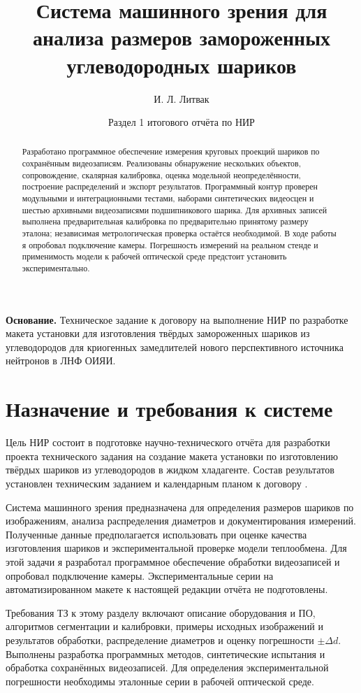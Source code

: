 \documentclass[12pt,a4paper]{article}
\title{Система машинного зрения для анализа размеров замороженных углеводородных шариков}
\author{И. Л. Литвак}
\date{Раздел 1 итогового отчёта по НИР}
\begin{document}
\maketitle
\noindent\textbf{Основание.} Техническое задание к договору на выполнение НИР по разработке макета установки для изготовления твёрдых замороженных шариков из углеводородов для криогенных замедлителей нового перспективного источника нейтронов в ЛНФ ОИЯИ.

\begin{abstract}
Разработано программное обеспечение измерения круговых проекций шариков по сохранённым видеозаписям. Реализованы обнаружение нескольких объектов, сопровождение, скалярная калибровка, оценка модельной неопределённости, построение распределений и экспорт результатов. Программный контур проверен модульными и интеграционными тестами, наборами синтетических видеосцен и шестью архивными видеозаписями подшипникового шарика. Для архивных записей выполнена предварительная калибровка по предварительно принятому размеру эталона; независимая метрологическая проверка остаётся необходимой. В ходе работы я опробовал подключение камеры. Погрешность измерений на реальном стенде и применимость модели к рабочей оптической среде предстоит установить экспериментально.
\end{abstract}
\clearpage
\tableofcontents
\clearpage

\section{Назначение и требования к системе}
Цель НИР состоит в подготовке научно-технического отчёта для разработки проекта технического задания на создание макета установки по изготовлению твёрдых шариков из углеводородов в жидком хладагенте. Состав результатов установлен техническим заданием и календарным планом к договору \cite{tz}.

Система машинного зрения предназначена для определения размеров шариков по изображениям, анализа распределения диаметров и документирования измерений. Полученные данные предполагается использовать при оценке качества изготовления шариков и экспериментальной проверке модели теплообмена. Для этой задачи я разработал программное обеспечение обработки видеозаписей и опробовал подключение камеры. Экспериментальные серии на автоматизированном макете к настоящей редакции отчёта не подготовлены.

Требования ТЗ к этому разделу включают описание оборудования и ПО, алгоритмов сегментации и калибровки, примеры исходных изображений и результатов обработки, распределение диаметров и оценку погрешности $\pm\Delta d$. Выполнены разработка программных методов, синтетические испытания и обработка сохранённых видеозаписей. Для определения экспериментальной погрешности необходимы эталонные серии в рабочей оптической среде.
\end{document}
